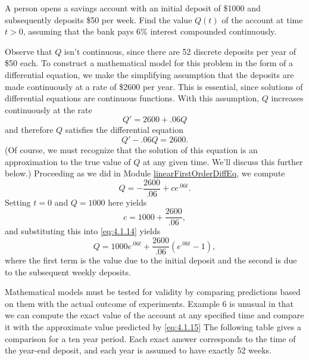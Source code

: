 \documentclass{ximera}
\begin{document}
\begin{example}\label{example:4.1.6}
A person opens a savings account with an initial deposit of \$1000 and
subsequently deposits \$50 per week. Find the value $Q(t)$ of the
account at time $t > 0$, assuming that the bank pays 6\%
interest compounded continuously.
\begin{explanation}
Observe that $Q$ isn't  continuous, since there are 52
discrete deposits per year of \$50 each. To construct a mathematical
model for this problem in the form of a differential equation, we make
the simplifying assumption that the deposits are made continuously at
a rate of \$2600 per year. This is essential, since solutions of
differential equations are continuous functions. With this assumption,
$Q$ increases continuously at the rate
$$
Q'=2600+.06 Q
$$
and therefore $Q$ satisfies the differential equation
\begin{equation} \label{eq:4.1.13}
Q'-.06Q=2600.
\end{equation}
(Of course, we must recognize that the solution of this equation
is an approximation to the true value of $Q$ at any given time. We'll
discuss this further below.)  
Proceeding as we did in Module \href{https://ximera.osu.edu/ode/main/linearFirstOrderDiffEq/linearFirstOrderDiffEq}{linearFirstOrderDiffEq}, we compute
\begin{equation} \label{eq:4.1.14}
Q=-\frac{2600}{.06}+ce^{.06t}.
\end{equation}
 Setting $t=0$ and $Q=1000$ here yields
$$
c=1000+\frac{2600}{.06},
$$
and substituting this into \eqref{eq:4.1.14} yields
\begin{equation} \label{eq:4.1.15}
Q=1000e^{.06t}+\frac{2600}{.06}(e^{.06t}-1),%
\end{equation}
where the first term is the value due to the initial deposit and the
second is due to the subsequent weekly deposits.
\end{explanation}
\end{example}

Mathematical models must be tested for validity by comparing
predictions based on them with the actual outcome of experiments.
Example 6 is unusual in that we can compute the exact value of the
account at any specified time and compare it with the approximate
value predicted by \eqref{eq:4.1.15} %
The following table gives a comparison for a ten year period. Each exact answer corresponds to the time of the year-end deposit, and each year is assumed to have exactly 52 weeks.
\end{document}
